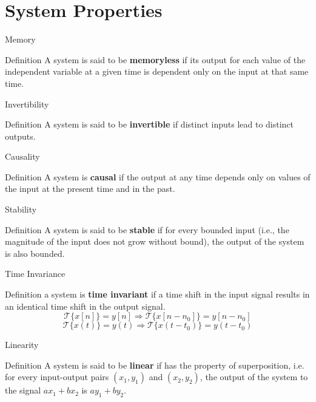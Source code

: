 \documentclass[aspectratio=169]{beamer}
\begin{document}
\section{System Properties}
	\begin{frame}{Memory}
		\begin{block}{Definition}
			A system is said to be \textbf{memoryless} if its output for each value of the independent variable at a given time is dependent only on the input at that same time.
		\end{block}
	\end{frame}
	
	\begin{frame}{Invertibility}
	\begin{block}{Definition}
		A system is said to be \textbf{invertible} if distinct inputs lead to distinct outputs.
	\end{block}
\end{frame}

	\begin{frame}{Causality}
	\begin{block}{Definition}
		A system is \textbf{causal} if the output at any time depends only on values of the input at the present time and in the past.
	\end{block}
\end{frame}

	\begin{frame}{Stability}
	\begin{block}{Definition}
		A system is said to be \textbf{stable} if for every bounded input (i.e., the magnitude of the input	does not grow without bound), the output of the system is also bounded.
	\end{block}
\end{frame}

	\begin{frame}{Time Invariance}
	\begin{block}{Definition}
		a system is \textbf{time invariant} if a time shift in the input signal results in an identical time shift in the output signal.
		\[\mathcal{T}\{x[n]\}=y[n]\Rightarrow\mathcal{T}\{x[n-n_0]\}=y[n-n_0]\]
		\[\mathcal{T}\{x(t)\}=y(t)\Rightarrow\mathcal{T}\{x(t-t_0)\}=y(t-t_0)\]
	\end{block}
\end{frame}

	\begin{frame}{Linearity}
	\begin{block}{Definition}
		A system is said to be \textbf{linear} if has the property of superposition, i.e. for every input-output pairs $ (x_1,y_1) $ and $ (x_2, y_2) $, the output of the system to the signal $ ax_1 + bx_2 $ is $ ay_1 + by_2 $.
	\end{block}
\end{frame}	
\end{document}

